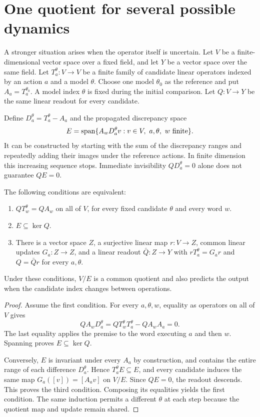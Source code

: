 \section{One quotient for several possible dynamics}
A stronger situation arises when the operator itself is uncertain. Let $V$ be a finite-dimensional vector space over a fixed field, and let $Y$ be a vector space over the same field. Let $T_a^\theta:V\to V$ be a finite family of candidate linear operators indexed by an action $a$ and a model $\theta$. Choose one model $\theta_0$ as the reference and put $A_a=T_a^{\theta_0}$. A model index $\theta$ is fixed during the initial comparison. Let $Q:V\to Y$ be the same linear readout for every candidate.

Define $D_a^\theta=T_a^\theta-A_a$ and the propagated discrepancy space
\[
E=\Span\{A_wD_a^\theta v: v\in V,\ a,\theta,\ w\text{ finite}\}.
\]
It can be constructed by starting with the sum of the discrepancy ranges and repeatedly adding their images under the reference actions. In finite dimension this increasing sequence stops. Immediate invisibility $QD_a^\theta=0$ alone does not guarantee $QE=0$.

\begin{theorem}\label{r:common}
The following conditions are equivalent:
\begin{enumerate}
\item $QT_w^\theta=QA_w$ on all of $V$, for every fixed candidate $\theta$ and every word $w$.
\item $E\subseteq\ker Q$.
\item There is a vector space $Z$, a surjective linear map $r:V\to Z$, common linear updates $G_a:Z\to Z$, and a linear readout $\bar Q:Z\to Y$ with $rT_a^\theta=G_ar$ and $Q=\bar Qr$ for every $a,\theta$.
\end{enumerate}
Under these conditions, $V/E$ is a common quotient and also predicts the output when the candidate index changes between operations.
\end{theorem}
\begin{proof}
Assume the first condition. For every $a,\theta,w$, equality as operators on all of $V$ gives
\[
QA_wD_a^\theta=QT_w^\theta T_a^\theta-QA_wA_a=0.
\]
The last equality applies the premise to the word executing $a$ and then $w$. Spanning proves $E\subseteq\ker Q$.

Conversely, $E$ is invariant under every $A_a$ by construction, and contains the entire range of each difference $D_a^\theta$. Hence $T_a^\theta E\subseteq E$, and every candidate induces the same map $G_a([v])=[A_av]$ on $V/E$. Since $QE=0$, the readout descends. This proves the third condition. Composing its equalities yields the first condition. The same induction permits a different $\theta$ at each step because the quotient map and update remain shared.
\end{proof}

